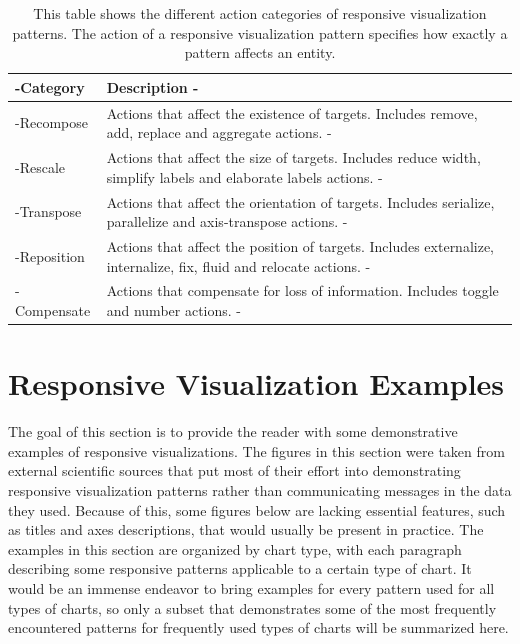 \begin{table}[tp]
\tablestretch
{}
\centering
\begin{tabularx}{\linewidth}{>{\kern-\tabcolsep}lX<{\kern-\tabcolsep}}
\toprule
Category & Description \\
\midrule
Recompose & Actions that affect the existence of targets. Includes remove, add, replace and aggregate actions. \\
Rescale & Actions that affect the size of targets. Includes reduce width, simplify labels and elaborate labels actions. \\
Transpose & Actions that affect the orientation of targets. Includes serialize, parallelize and axis-transpose actions. \\
Reposition & Actions that affect the position of targets. Includes externalize, internalize, fix, fluid and relocate actions. \\
Compensate & Actions that compensate for loss of information. Includes toggle and number actions. \\
\bottomrule
\end{tabularx}
\caption[Actions of Responsive Visualization Patterns]{
  This table shows the different action categories of responsive visualization patterns. 
  The action of a responsive visualization pattern specifies how exactly a pattern affects an entity.
}
\label{tab:PatternsActions}
\end{table}

\section{Responsive Visualization Examples}

The goal of this section is to provide the reader with some demonstrative examples of responsive visualizations. The figures in this section were taken from external scientific sources that put most of their effort into demonstrating responsive visualization patterns rather than communicating messages in the data they used. Because of this, some figures below are lacking essential features, such as titles and axes descriptions, that would usually be present in practice. The examples in this section are organized by chart type, with each paragraph describing some responsive patterns applicable to a certain type of chart. It would be an immense endeavor to bring examples for every pattern used for all types of charts, so only a subset that demonstrates some of the most frequently encountered patterns for frequently used types of charts will be summarized here.

